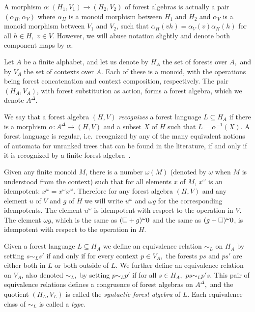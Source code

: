 \documentclass{LMCS}
\begin{document}
 A morphism $\alpha:(H_1,V_1)\to (H_2,V_2)$ of forest algebras is actually a
 pair $(\alpha_H,\alpha_V)$ where $\alpha_H$ is a monoid morphism between $H_1$ and
 $H_2$ and $\alpha_V$ is a monoid morphism between $V_1$ and $V_2$, such that
 $\alpha_H(vh)=\alpha_V(v)\alpha_H(h)$ for all $h\in H,$ $v\in V.$ However, we will
 abuse notation slightly and denote both component maps by $\alpha.$

 Let $A$ be a finite alphabet, and let us denote by $H_A$ the set of
 forests over $A,$ and by $V_A$ the set of contexts over $A.$ Each of
 these is a monoid, with the operations being forest concatenation and
 context composition, respectively. The pair $(H_A,V_A)$, with forest
 substitution as action, forms a forest algebra, which we denote
 $A^{\Delta}.$



 We say that a forest algebra $(H,V)$ {\it recognizes} a forest
 language $L\subseteq H_A$ if there is a morphism
 $\alpha:A^{\Delta}\to (H,V)$ and a subset $X$ of $H$ such that
 $L=\alpha^{-1}(X).$ A forest language is regular, i.e.~recognized by any of the many equivalent notions of automata for unranked trees that can be found in the literature, if and only if it is
 recognized by a finite forest algebra~\cite{forestalgebra}.

 Given any finite monoid $M$, there is a number $\omega(M)$ (denoted by
 $\omega$ when $M$ is understood from the context) such that for all elements
 $x$ of $M$, $x^\omega$ is an idempotent: $x^\omega=x^\omega x^\omega$.
 Therefore for any forest algebra $(H,V)$ and any element $u$ of $V$ and $g$ of
 $H$ we will write $u^\omega$ and $\omega g$ for the corresponding
 idempotents. The element $u^\omega$ is idempotent with respect to the
 operation in $V$. The element $\omega g$, which is the same as
 $(\Box+g)^\omega 0$ and the same as $(g+\Box)^\omega 0$, is idempotent with
 respect to the operation in $H$.


 Given a forest language $L\subseteq H_A$ we define an equivalence relation $\sim_L$ on
 $H_A$ by setting $s\sim_L s'$ if and only if for every context $p\in
 V_A,$ the forests $ps$ and $ps'$ are either both in $L$ or both outside of $L.$
 We further define an equivalence relation on $V_A$, also denoted
 $\sim_L,$ by setting $p\sim_L p'$ if for all $s\in H_A,$ $ps\sim_L
 p's.$ This pair of equivalence relations defines a congruence of
 forest algebras on $A^{\Delta},$ and the quotient $(H_L,V_L)$ is
 called the {\it syntactic forest algebra} of $L.$ Each equivalence
 class of $\sim_L$ is called a \emph{type}.
\end{document}
